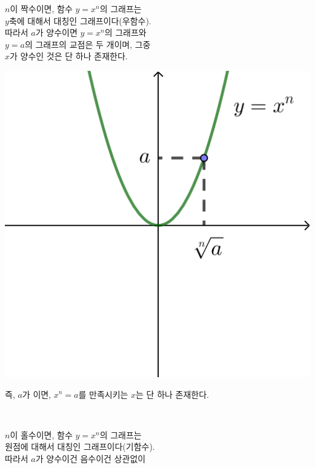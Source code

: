 \documentclass{oblivoir}
\begin{document}
\newpage
%
\rema{}
\begin{enumerate}\label{nthroot15}
\begin{minipage}{0.6\textwidth}
\item
\(n\)이 짝수이면,  함수 \(y=x^n\)의 그래프는\\
\(y\)축에 대해서 대칭인 그래프이다(우함수).\\
따라서 \(a\)가 양수이면 \(y=x^n\)의 그래프와\\
\(y=a\)의 그래프의 교점은 두 개이며, 그중\\
\(x\)가 양수인 것은 단 하나 존재한다.
\end{minipage}
\begin{minipage}{.3\textwidth}
\begin{center}
\includegraphics[height=0.2\textheight]{nthroot-even}
\end{center}
\end{minipage}
\par
즉, \(a\)가 이면, \(x^n=a\)를 만족시키는   \(x\)는 단 하나 존재한다.
\begin{minipage}{0.6\textwidth}\
\item
\(n\)이 홀수이면,  함수 \(y=x^n\)의 그래프는\\
원점에 대해서 대칭인 그래프이다(기함수).\\
따라서 \(a\)가 양수이건 음수이건 상관없이\\

\end{minipage}
\end{enumerate}
\end{document}

